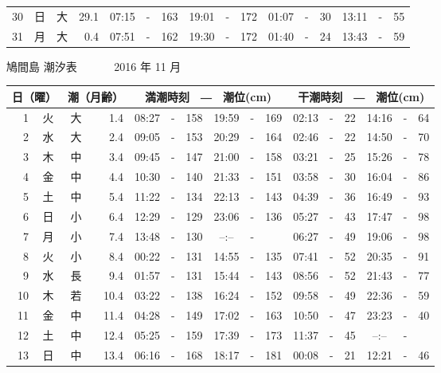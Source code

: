 \documentclass[12pt.a4j]{jsarticle}
\begin{document}
\begin{center}
\begin{table}[ht]
\begin{tabular}{|rc|cr|ccrccr|ccrccr|}
30 & 日 & 大 & 29.1 &  07:15 &-& 163  &  19:01 &-& 172  &   01:07 &-&  30  &   13:11 &-&  55  \\
31 & 月 & 大 &  0.4 &  07:51 &-& 162  &  19:30 &-& 172  &   01:40 &-&  24  &   13:43 &-&  59  \\
   \hline
   \end{tabular}
\end{table}
\newpage
 {\LARGE 鳩間島  潮汐表　　　}
 {\large 2016 年 11 月}\\
 \begin{table}[ht]
    \begin{tabular}{|rc|cr|ccrccr|ccrccr|}
    \hline
    \multicolumn{2}{|c|}{日（曜）} & \multicolumn{2}{c|}{潮（月齢）} & \multicolumn{6}{c|}{満潮時刻　―　潮位(cm)} & \multicolumn{6}{c|}{干潮時刻　―　潮位(cm)} \\
 \hline
 1 & 火 & 大 &  1.4 &  08:27 &-& 158  &  19:59 &-& 169  &   02:13 &-&  22  &   14:16 &-&  64  \\
 2 & 水 & 大 &  2.4 &  09:05 &-& 153  &  20:29 &-& 164  &   02:46 &-&  22  &   14:50 &-&  70  \\
 3 & 木 & 中 &  3.4 &  09:45 &-& 147  &  21:00 &-& 158  &   03:21 &-&  25  &   15:26 &-&  78  \\
 4 & 金 & 中 &  4.4 &  10:30 &-& 140  &  21:33 &-& 151  &   03:58 &-&  30  &   16:04 &-&  86  \\
 5 & 土 & 中 &  5.4 &  11:22 &-& 134  &  22:13 &-& 143  &   04:39 &-&  36  &   16:49 &-&  93  \\
 6 & 日 & 小 &  6.4 &  12:29 &-& 129  &  23:06 &-& 136  &   05:27 &-&  43  &   17:47 &-&  98  \\
 7 & 月 & 小 &  7.4 &  13:48 &-& 130  &  --:-- &-&     &   06:27 &-&  49  &   19:06 &-&  98  \\
 8 & 火 & 小 &  8.4 &  00:22 &-& 131  &  14:55 &-& 135  &   07:41 &-&  52  &   20:35 &-&  91  \\
 9 & 水 & 長 &  9.4 &  01:57 &-& 131  &  15:44 &-& 143  &   08:56 &-&  52  &   21:43 &-&  77  \\
10 & 木 & 若 & 10.4 &  03:22 &-& 138  &  16:24 &-& 152  &   09:58 &-&  49  &   22:36 &-&  59  \\
11 & 金 & 中 & 11.4 &  04:28 &-& 149  &  17:02 &-& 163  &   10:50 &-&  47  &   23:23 &-&  40  \\
12 & 土 & 中 & 12.4 &  05:25 &-& 159  &  17:39 &-& 173  &   11:37 &-&  45  &   --:-- &-&     \\
13 & 日 & 中 & 13.4 &  06:16 &-& 168  &  18:17 &-& 181  &   00:08 &-&  21  &   12:21 &-&  46  \\

\end{tabular}
\end{table}
\end{center}
\end{document}
